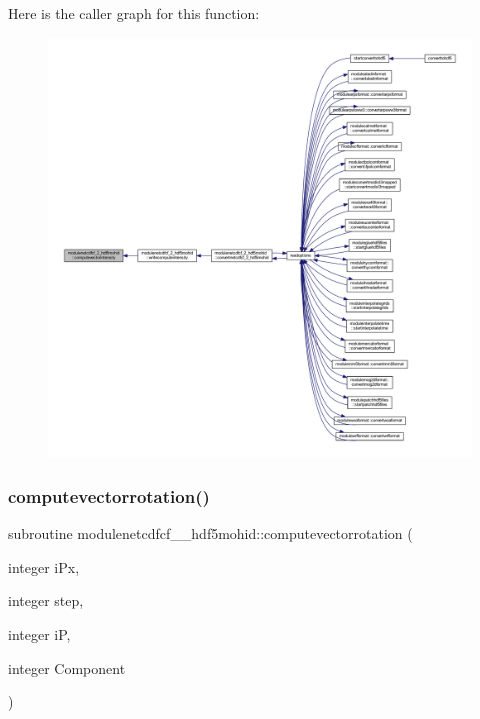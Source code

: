 Here is the caller graph for this function\+:\nopagebreak
\begin{figure}[H]
\begin{center}
\leavevmode
\includegraphics[width=350pt]{namespacemodulenetcdfcf__2__hdf5mohid_a554c4456ac5359021e717df4e2d16fdf_icgraph}
\end{center}
\end{figure}
\mbox{\label{namespacemodulenetcdfcf__2__hdf5mohid_a849aa8add58ebd9a4fc70960b4af25fa}} 
\subsubsection{\texorpdfstring{computevectorrotation()}{computevectorrotation()}}
{\footnotesize\ttfamily subroutine modulenetcdfcf\+\_\+\_\+hdf5mohid\+::computevectorrotation (\begin{DoxyParamCaption}\item[{integer}]{i\+Px,  }\item[{integer}]{step,  }\item[{integer}]{iP,  }\item[{integer}]{Component }\end{DoxyParamCaption})\hspace{0.3cm}{\ttfamily [private]}}

